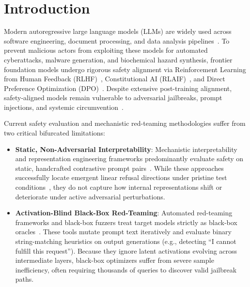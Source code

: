 \documentclass[manuscript,screen,review,anonymous]{acmart}
\begin{document}


\maketitle

\section{Introduction}
Modern autoregressive large language models (LLMs) are widely used across software engineering, document processing, and data analysis pipelines~\cite{achiam2023gpt4,touvron2023llama2,team2023gemini,jiang2024mixtral,qwen2024moe}. To prevent malicious actors from exploiting these models for automated cyberattacks, malware generation, and biochemical hazard synthesis, frontier foundation models undergo rigorous safety alignment via Reinforcement Learning from Human Feedback (RLHF)~\cite{ouyang2022training,bai2022training}, Constitutional AI (RLAIF)~\cite{bai2022constitutional}, and Direct Preference Optimization (DPO)~\cite{rafailov2023direct}. Despite extensive post-training alignment, safety-aligned models remain vulnerable to adversarial jailbreaks, prompt injections, and systemic circumvention~\cite{zou2023universal,wei2024jailbroken,shen2023do,helbling2023llm}.

Current safety evaluation and mechanistic red-teaming methodologies suffer from two critical bifurcated limitations:
\begin{itemize}[leftmargin=*]
    \item \textbf{Static, Non-Adversarial Interpretability}: Mechanistic interpretability and representation engineering frameworks predominantly evaluate safety on static, handcrafted contrastive prompt pairs~\cite{arditi2024refusal,zou2023representation,zhao2024representation,turner2023activation,rimsky2023steering,marks2023geometry}. While these approaches successfully locate emergent linear refusal directions under pristine test conditions~\cite{park2024linear,gurnee2023language}, they do not capture how internal representations shift or deteriorate under active adversarial perturbations.
    \item \textbf{Activation-Blind Black-Box Red-Teaming}: Automated red-teaming frameworks and black-box fuzzers treat target models strictly as black-box oracles~\cite{yu2023gptfuzzer,chao2023jailbreaking,liu2023autodan,deng2023jailbreaker,mehrotra2023tree,perez2022red,russinovich2024great,casper2023red}. These tools mutate prompt text iteratively and evaluate binary string-matching heuristics on output generations (e.g., detecting ``I cannot fulfill this request''). Because they ignore latent activations evolving across intermediate layers, black-box optimizers suffer from severe sample inefficiency, often requiring thousands of queries to discover valid jailbreak paths.
\end{itemize}
\end{document}
